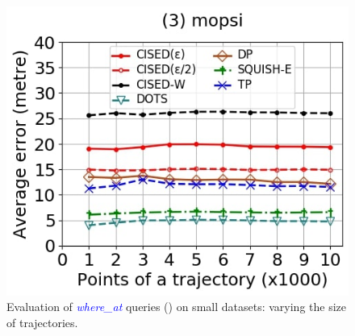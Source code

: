 {\begin{figure}[tb!]
	\includegraphics[scale=0.250]{Figures/Exp-where-SED-error-size-mopsi.jpg}		
	\vspace{-2ex}
	\caption{\small Evaluation of \textcolor{blue}{\emph{where\_at}} queries (\sed) on small datasets: varying the size of
		trajectories.}
	\label{fig:query-sed-size}
	\vspace{-1ex}
\end{figure}


}
